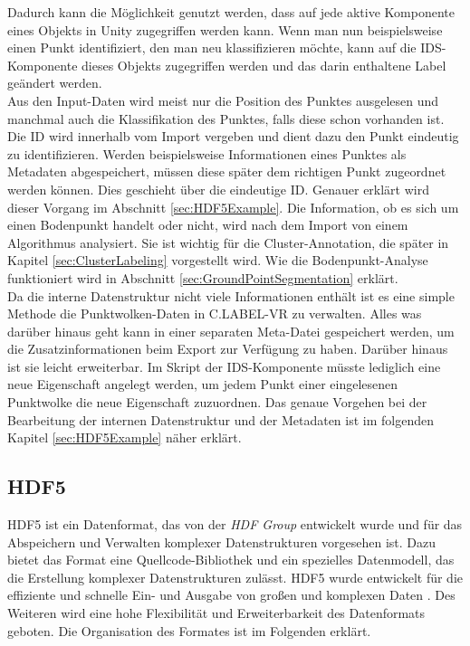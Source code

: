 Dadurch kann die Möglichkeit genutzt werden, dass auf jede aktive Komponente eines Objekts in Unity zugegriffen werden kann. Wenn man nun beispielsweise einen Punkt identifiziert, den man neu klassifizieren möchte, kann auf die IDS-Komponente dieses Objekts zugegriffen werden und das darin enthaltene Label geändert werden.\\

Aus den Input-Daten wird meist nur die Position des Punktes ausgelesen und manchmal auch die Klassifikation des Punktes, falls diese schon vorhanden ist. Die ID wird innerhalb vom Import vergeben und dient dazu den Punkt eindeutig zu identifizieren. Werden beispielsweise Informationen eines Punktes als Metadaten abgespeichert, müssen diese später dem richtigen Punkt zugeordnet werden können. Dies geschieht über die eindeutige ID. Genauer erklärt wird dieser Vorgang im Abschnitt \ref{sec:HDF5Example}. Die Information, ob es sich um einen Bodenpunkt handelt oder nicht, wird nach dem Import von einem Algorithmus analysiert. Sie ist wichtig für die Cluster-Annotation, die später in Kapitel \ref{sec:ClusterLabeling} vorgestellt wird. Wie die Bodenpunkt-Analyse funktioniert wird in Abschnitt \ref{sec:GroundPointSegmentation} erklärt. \\

Da die interne Datenstruktur nicht viele Informationen enthält ist es eine simple Methode die Punktwolken-Daten in C.LABEL-VR zu verwalten. Alles was darüber hinaus geht kann in einer separaten Meta-Datei gespeichert werden, um die Zusatzinformationen beim Export zur Verfügung zu haben. Darüber hinaus ist sie leicht erweiterbar. Im Skript der IDS-Komponente müsste lediglich eine neue Eigenschaft angelegt werden, um jedem Punkt einer eingelesenen Punktwolke die neue Eigenschaft zuzuordnen. Das genaue Vorgehen bei der Bearbeitung der internen Datenstruktur und der Metadaten ist im folgenden Kapitel \ref{sec:HDF5Example} näher erklärt.

\subsection{HDF5}
\label{sec:HDF5}

HDF5 ist ein Datenformat, das von der \textit{HDF Group} entwickelt wurde und für das Abspeichern und Verwalten komplexer Datenstrukturen vorgesehen ist. Dazu bietet das Format eine Quellcode-Bibliothek und ein spezielles Datenmodell, das die Erstellung komplexer Datenstrukturen zulässt. HDF5 wurde entwickelt für die effiziente und schnelle Ein- und Ausgabe von großen und komplexen Daten \cite{bib:HDF5Main}. Des Weiteren wird eine hohe Flexibilität und Erweiterbarkeit des Datenformats geboten. Die Organisation des Formates ist im Folgenden erklärt.\\

